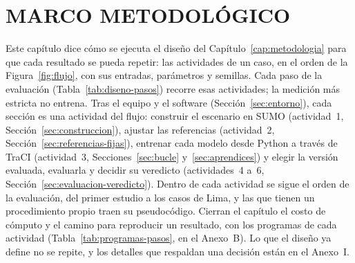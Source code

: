 \chapter{MARCO METODOLÓGICO}
\label{cap:implementacion}

Este capítulo dice cómo se ejecuta el diseño del
Capítulo~\ref{cap:metodologia} para que cada resultado se pueda repetir:
las actividades de un caso, en el orden de la Figura~\ref{fig:flujo},
con sus entradas, parámetros y semillas. Cada paso de la evaluación
(Tabla~\ref{tab:diseno-pasos}) recorre esas actividades; la medición
más estricta no entrena. Tras el
equipo y el software (Sección~\ref{sec:entorno}), cada sección es una
actividad del flujo: construir el escenario en SUMO (actividad~1,
Sección~\ref{sec:construccion}), ajustar las referencias (actividad~2,
Sección~\ref{sec:referencias-fijas}), entrenar cada modelo desde Python
a través de TraCI (actividad~3, Secciones~\ref{sec:bucle}
y~\ref{sec:aprendices}) y elegir la versión evaluada, evaluarla y
decidir su veredicto (actividades~4 a~6,
Sección~\ref{sec:evaluacion-veredicto}). Dentro de cada actividad se
sigue el orden de la evaluación, del primer estudio a los casos de
Lima, y las que tienen un procedimiento propio traen su pseudocódigo.
Cierran el capítulo el costo de cómputo y el camino para reproducir un
resultado, con los programas de cada actividad
(Tabla~\ref{tab:programas-pasos}, en el Anexo~B). Lo que el diseño ya
define no se repite, y los detalles que respaldan una decisión están en
el Anexo~I.

